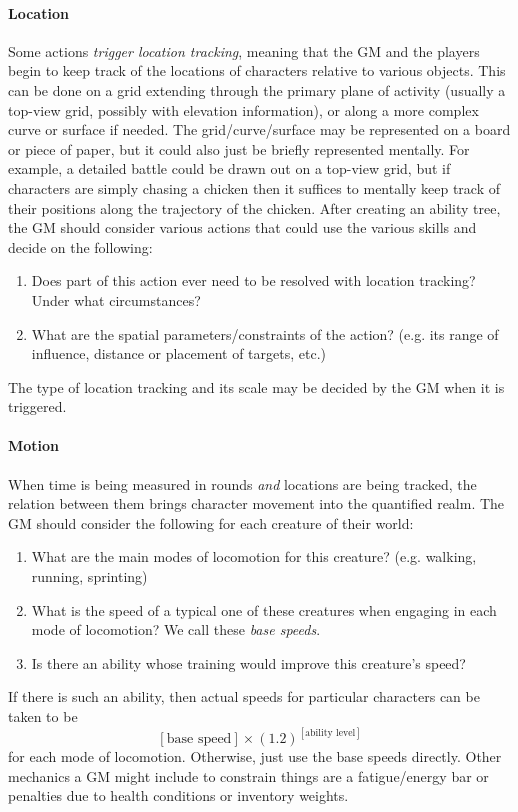\documentclass[12pt]{article}
\begin{document}
\paragraph{Location}
Some actions \emph{trigger location tracking},
meaning that the GM and the players begin to keep track of the locations of characters relative to various objects.
This can be done on a grid extending through the primary plane of activity
(usually a top-view grid, possibly with elevation information),
or along a more complex curve or surface if needed.
The grid/curve/surface may be represented on a board or piece of paper, but it could also just be briefly represented mentally.
For example, a detailed battle could be drawn out on a top-view grid,
but if characters are simply chasing a chicken then it suffices to mentally keep track
of their positions along the trajectory of the chicken.
After creating an ability tree, the GM should consider various actions
that could use the various skills and decide on the following:
\vspace{-1em}
\begin{enumerate}
\item\label{itm:grid:trigger}
Does part of this action ever need to be resolved with location tracking? Under what circumstances?
\item\label{itm:grid:length}
What are the spatial parameters/constraints of the action? (e.g. its range of influence, distance or placement of targets, etc.)
\end{enumerate}
The type of location tracking and its scale may be decided by the GM when it is triggered.



\paragraph{Motion}
When time is being measured in rounds \emph{and} locations are being tracked,
the relation between them brings character movement into the quantified realm.
The GM should consider the following for each creature of their world:
\vspace{-1em}
\begin{enumerate}
\item What are the main modes of locomotion for this creature? (e.g. walking, running, sprinting)
\item What is the speed of a typical one of these creatures when engaging in each mode of locomotion?
We call these \emph{base speeds}.
\item Is there an ability whose training would improve this creature's speed?
\end{enumerate}
If there is such an ability, then actual speeds
for particular characters can be taken to be
$$ [\text{base speed}]\times (1.2)^{[\text{ability level}]} $$
for each mode of locomotion.
Otherwise, just use the base speeds directly.
Other mechanics a GM might include to constrain things are a fatigue/energy bar
or penalties due to health conditions or inventory weights.
\end{document}

